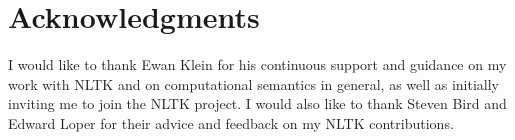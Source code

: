 \documentclass[11pt]{article}
\begin{document}
\section{Acknowledgments}
I would like to thank Ewan Klein for his continuous support and guidance on my work with NLTK and on computational semantics in general, as well as initially inviting me to join the NLTK project.  I would also like to thank Steven Bird and Edward Loper for their advice and feedback on my NLTK contributions.


{}
\end{document}
